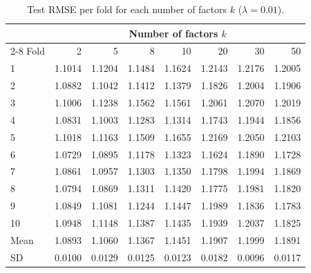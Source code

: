 	\begin{table}[ht]
		\centering
		\caption{Test RMSE per fold for each number of factors $k$ ($\lambda = 0.01$).}
		\label{tab:fold-test}
		\begin{tabular}{@{}lrrrrrrr@{}}
			\toprule
			& \multicolumn{7}{c}{Number of factors $k$} \\
			\cmidrule(l){2-8}
			Fold & 2 & 5 & 8 & 10 & 20 & 30 & 50 \\
			\midrule
			1  & 1.1014 & 1.1204 & 1.1484 & 1.1624 & 1.2143 & 1.2176 & 1.2005 \\
			2  & 1.0882 & 1.1042 & 1.1412 & 1.1379 & 1.1826 & 1.2004 & 1.1906 \\
			3  & 1.1006 & 1.1238 & 1.1562 & 1.1561 & 1.2061 & 1.2070 & 1.2019 \\
			4  & 1.0831 & 1.1003 & 1.1283 & 1.1314 & 1.1743 & 1.1944 & 1.1856 \\
			5  & 1.1018 & 1.1163 & 1.1509 & 1.1655 & 1.2169 & 1.2050 & 1.2103 \\
			6  & 1.0729 & 1.0895 & 1.1178 & 1.1323 & 1.1624 & 1.1890 & 1.1728 \\
			7  & 1.0861 & 1.0957 & 1.1303 & 1.1350 & 1.1798 & 1.1994 & 1.1869 \\
			8  & 1.0794 & 1.0869 & 1.1311 & 1.1420 & 1.1775 & 1.1981 & 1.1820 \\
			9  & 1.0849 & 1.1081 & 1.1244 & 1.1447 & 1.1989 & 1.1836 & 1.1783 \\
			10 & 1.0948 & 1.1148 & 1.1387 & 1.1435 & 1.1939 & 1.2037 & 1.1825 \\
			\midrule
			Mean & 1.0893 & 1.1060 & 1.1367 & 1.1451 & 1.1907 & 1.1999 & 1.1891 \\
			SD   & 0.0100 & 0.0129 & 0.0125 & 0.0123 & 0.0182 & 0.0096 & 0.0117 \\
			\bottomrule
		\end{tabular}
	\end{table}
	
